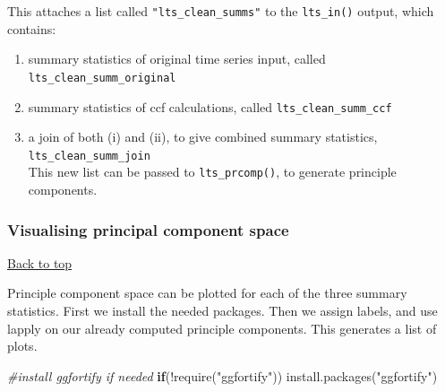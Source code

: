 \documentclass[
]{article}
\newenvironment{Shaded}{\begin{snugshade}}{\end{snugshade}}
\newcommand{\CommentTok}[1]{\textcolor[rgb]{0.56,0.35,0.01}{\textit{#1}}}
\newcommand{\ControlFlowTok}[1]{\textcolor[rgb]{0.13,0.29,0.53}{\textbf{#1}}}
\newcommand{\FunctionTok}[1]{\textcolor[rgb]{0.00,0.00,0.00}{#1}}
\newcommand{\NormalTok}[1]{#1}
\newcommand{\OtherTok}[1]{\textcolor[rgb]{0.56,0.35,0.01}{#1}}
\newcommand{\SpecialCharTok}[1]{\textcolor[rgb]{0.00,0.00,0.00}{#1}}
\newcommand{\StringTok}[1]{\textcolor[rgb]{0.31,0.60,0.02}{#1}}
\begin{document}
This attaches a list called \texttt{"lts\_clean\_summs"} to the
\texttt{lts\_in()} output, which contains:

\begin{enumerate}
\def\labelenumi{\roman{enumi}.}
\item
  summary statistics of original time series input, called
  \texttt{lts\_clean\_summ\_original}
\item
  summary statistics of ccf calculations, called
  \texttt{lts\_clean\_summ\_ccf}
\item
  a join of both (i) and (ii), to give combined summary statistics,
  \texttt{lts\_clean\_summ\_join}\\

  This new list can be passed to \texttt{lts\_prcomp()}, to generate
  principle components.
\end{enumerate}

\begin{Shaded}
\end{Shaded}

\hypertarget{visualising-principal-component-space}{%
\subsubsection{\texorpdfstring{\textbf{Visualising principal component
space}}{Visualising principal component space}}\label{visualising-principal-component-space}}

\protect\hyperlink{}{Back to top}

Principle component space can be plotted for each of the three summary
statistics. First we install the needed packages. Then we assign labels,
and use lapply on our already computed principle components. This
generates a list of plots.

\begin{Shaded}
\begin{Highlighting}[]
\CommentTok{\#install ggfortify if needed}
\ControlFlowTok{if}\NormalTok{(}\SpecialCharTok{!}\FunctionTok{require}\NormalTok{(}\StringTok{"ggfortify"}\NormalTok{)) }\FunctionTok{install.packages}\NormalTok{(}\StringTok{"ggfortify"}\NormalTok{)}
\end{Highlighting}
\end{Shaded}
\end{document}
